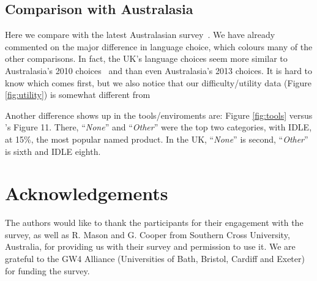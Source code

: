 \documentclass{sig-alternate}
\begin{document}

\subsection{Comparison with Australasia}

Here we compare with the latest Australasian
survey~\cite{mason+cooper:2014}. We have already commented on the
major difference in language choice, which colours many of the other
comparisons. In fact, the UK's language choices seem more similar to
Australasia's 2010 choices~\cite{mason-et-al:2012} and \cite[Table
4]{mason+cooper:2014} than even Australasia's 2013 choices. It is hard
to know which comes first, but we also notice that our
difficulty/utility data (Figure \ref{fig:utility}) is somewhat
different from \cite[Figures 7/8]{mason+cooper:2014}

Another difference shows up in the tools/enviroments are: Figure
\ref{fig:tools} versus \cite{mason+cooper:2014}'s Figure 11. There,
``{\emph{None}}'' and ``{\emph{Other}}'' were the top two categories,
with IDLE, at 15\%, the most popular named product. In the UK,
``{\emph{None}}'' is second, ``{\emph{Other}}'' is sixth and IDLE
eighth.


\section{Acknowledgements}

The authors would like to thank the participants for their engagement
with the survey, as well as R. Mason and G. Cooper from Southern Cross
University, Australia, for providing us with their survey and
permission to use it.
We are grateful to the GW4 Alliance (Universities of Bath, Bristol,
Cardiff and Exeter) for funding the  survey.  %


\end{document}
